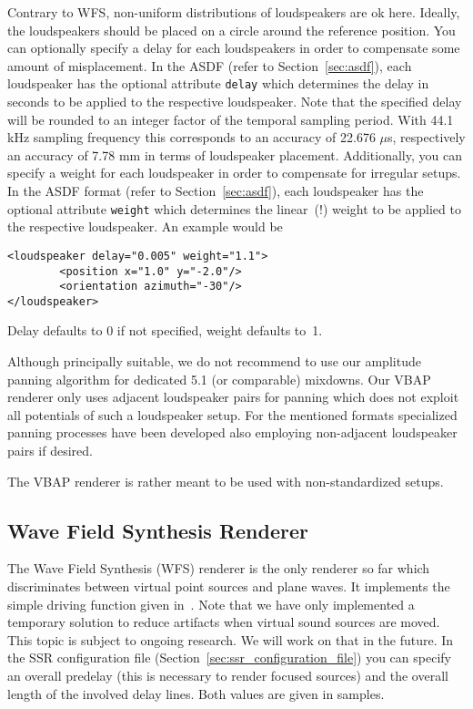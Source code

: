 Contrary to WFS, non-uniform distributions of loudspeakers are ok here.
Ideally, the loudspeakers should be placed on a circle around the reference
position. You can optionally specify a delay for each loudspeakers in order to
compensate some amount of misplacement. In the ASDF (refer to
Section~\ref{sec:asdf}), each loudspeaker has the optional attribute
\texttt{delay} which determines the delay in seconds to be applied to the
respective loudspeaker. Note that the specified delay will be rounded to an
integer factor of the temporal sampling period. With 44.1 kHz sampling
frequency this corresponds to an accuracy of 22.676 $\mu$s, respectively an
accuracy of 7.78 mm in terms of loudspeaker placement. Additionally, you can
specify a weight for each loudspeaker in order to compensate for irregular
setups. In the ASDF format (refer to Section~\ref{sec:asdf}), each loudspeaker
has the optional attribute \texttt{weight} which determines the linear~(!)
weight to be applied to the respective loudspeaker. An example would be
%
\begin{verbatim}
<loudspeaker delay="0.005" weight="1.1">
        <position x="1.0" y="-2.0"/>
        <orientation azimuth="-30"/>
</loudspeaker>
\end{verbatim}
%
Delay defaults to 0 if not specified, weight defaults to~1.

Although principally suitable, we do not recommend to use our amplitude panning
algorithm for dedicated 5.1 (or comparable) mixdowns. Our VBAP renderer only
uses adjacent loudspeaker pairs for panning which does not exploit all
potentials of such a loudspeaker setup. For the mentioned formats specialized
panning processes have been developed also employing non-adjacent loudspeaker
pairs if desired.

The VBAP renderer is rather meant to be used with non-standardized setups.
%
\subsection{Wave Field Synthesis Renderer}

The Wave Field Synthesis (WFS) renderer is the only renderer so far which
discriminates between virtual point sources and plane waves. It implements the
simple driving function given in~\cite{Spors08:WFS_AES}. Note that we have only
implemented a temporary solution to reduce artifacts when virtual sound sources
are moved. This topic is subject to ongoing research. We will work on that in
the future. In the SSR configuration file
(Section~\ref{sec:ssr_configuration_file}) you can specify an overall predelay
(this is necessary to render focused sources) and the overall length of the
involved delay lines. Both values are given in samples.

